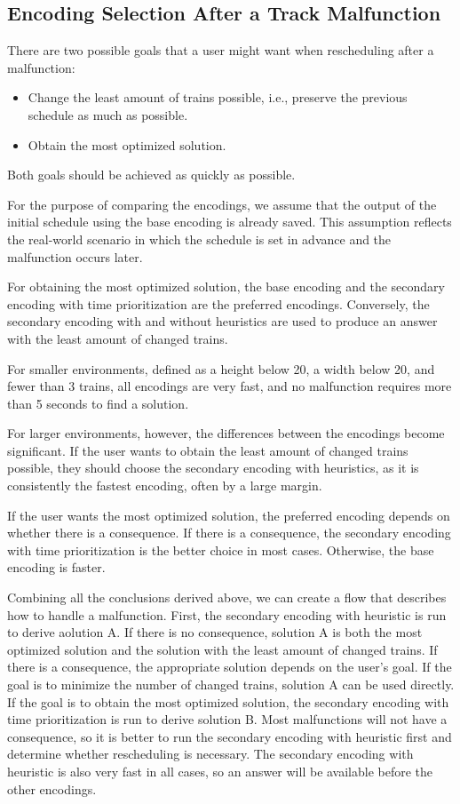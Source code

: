 \documentclass[runningheads]{llncs}
\begin{document}
\subsection{Encoding Selection After a Track Malfunction}

There are two possible goals that a user might want when rescheduling after
a malfunction:

\begin{itemize}
	\item Change the least amount of trains possible, i.e., preserve the
	previous schedule as much as possible.
	\item Obtain the most optimized solution.
\end{itemize}

Both goals should be achieved as quickly as possible.

For the purpose of comparing the encodings, we assume that the output of the
initial schedule using the base encoding is already saved. This assumption
reflects the real-world scenario in which the schedule is set in advance and
the malfunction occurs later.

For obtaining the most optimized solution, the base encoding and the
secondary encoding with time prioritization are the preferred encodings. Conversely, 
the secondary encoding with and without heuristics are used to produce 
an answer with the least amount of changed trains.

For smaller environments, defined as a height below 20, a
width below 20, and fewer than 3 trains, all encodings are very fast, and no
malfunction requires more than 5 seconds to find a solution.

For larger environments, however, the differences between the encodings become
significant. If the user wants to obtain the least amount of changed trains
possible, they should choose the secondary encoding with heuristics, as it is
consistently the fastest encoding, often by a large margin.

If the user wants the most optimized solution, the preferred encoding depends
on whether there is a consequence. If there is a consequence, the secondary
encoding with time prioritization is the better choice in most cases.
Otherwise, the base encoding is faster.

Combining all the conclusions derived above, we can create a flow that
describes how to handle a malfunction. First, the secondary encoding with heuristic is run
to derive aolution A. If there is no consequence, solution A is both the most
optimized solution and the solution with the least amount of changed trains.
If there is a consequence, the appropriate solution depends on the user's
goal. If the goal is to minimize the number of changed trains, solution A can
be used directly. If the goal is to obtain the most optimized solution, the
secondary encoding with time prioritization is run to derive solution B.
Most malfunctions will not have a consequence, so it is better to run the
secondary encoding with heuristic first and determine whether rescheduling is necessary.
The secondary encoding with heuristic is also very fast in all cases, so an answer will be
available before the other encodings.
\end{document}
